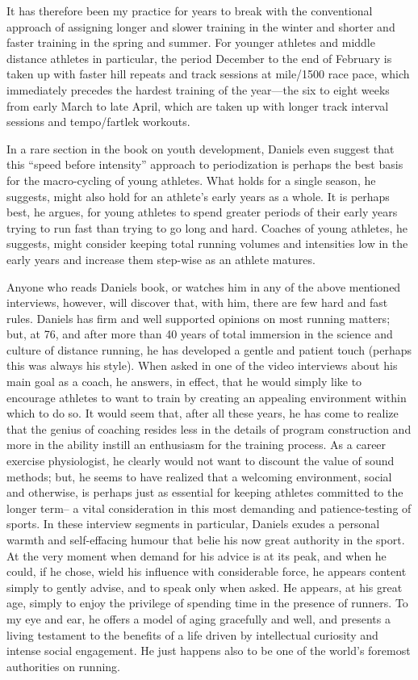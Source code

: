 It has therefore been my practice for years to break with the conventional approach of assigning longer and slower training in the winter and shorter and faster training in the spring and summer. For younger athletes and middle distance athletes in particular, the period December to the end of February is taken up with faster hill repeats and track sessions at mile/1500 race pace, which immediately precedes the hardest training of the year—the six to eight weeks from early March to late April, which are taken up with longer track interval sessions and tempo/fartlek workouts.

In a rare section in the book on youth development, Daniels even suggest that this “speed before intensity” approach to periodization is perhaps the best basis for the macro-cycling of young athletes. What holds for a single season, he suggests, might also hold for an athlete’s early years as a whole. It is perhaps best, he argues, for young athletes to spend greater periods of their early years trying to run fast than trying to go long and hard. Coaches of young athletes, he suggests, might consider keeping total running volumes and intensities low in the early years and increase them step-wise as an athlete matures.

Anyone who reads Daniels book, or watches him in any of the above mentioned interviews, however, will discover that, with him, there are few hard and fast rules. Daniels has firm and well supported opinions on most running matters; but, at 76, and after more than 40 years of total immersion in the science and culture of distance running, he has developed a gentle and patient touch (perhaps this was always his style). When asked in one of the video interviews about his main goal as a coach, he answers, in effect, that he would simply like to encourage athletes to want to train by creating an appealing environment within which to do so. It would seem that, after all these years, he has come to realize that the genius of coaching resides less in the details of program construction and more in the ability instill an enthusiasm for the training process. As a career exercise physiologist, he clearly would not want to discount the value of sound methods; but, he seems to have realized that a welcoming environment, social and otherwise, is perhaps just as essential for keeping athletes committed to the longer term-- a vital consideration in this most demanding and patience-testing of sports. In these interview segments in particular, Daniels exudes a personal warmth and self-effacing humour that belie his now great authority in the sport. At the very moment when demand for his advice is at its peak, and when he could, if he chose, wield his influence with considerable force, he appears content simply to gently advise, and to speak only when asked. He appears, at his great age, simply to enjoy the privilege of spending time in the presence of runners. To my eye and ear, he offers a model of aging gracefully and well, and presents a living testament to the benefits of a life driven by intellectual curiosity and intense social engagement. He just happens also to be one of the world's foremost authorities on running.




